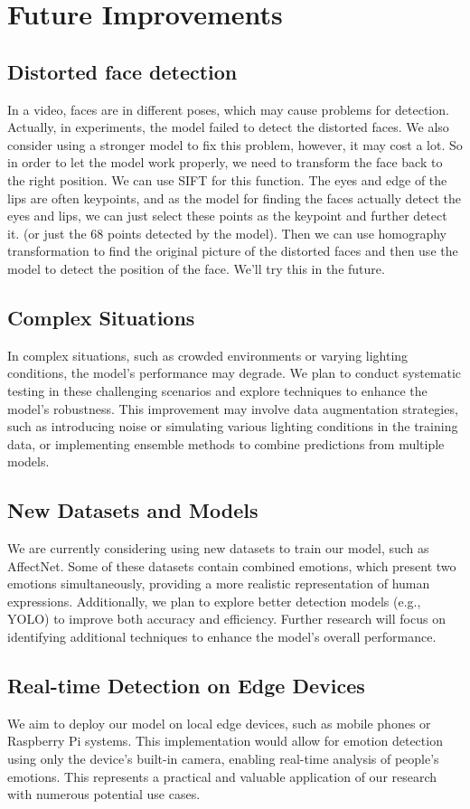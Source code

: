 \section{Future Improvements}
\subsection{Distorted face detection}
In a video, faces are in different poses, which may cause problems for detection. Actually, in experiments, the model failed to detect the distorted faces. We also consider using a stronger model to fix this problem, however, it may cost a lot. 
So in order to let the model work properly, we need to transform the face back to the right position. We can use SIFT for this function. The eyes and edge of the lips are often keypoints, and as the model for finding the faces actually detect the eyes and lips, we can just select these points as the keypoint and further detect it. (or just the 68 points detected by the model).
Then we can use homography transformation to find the original picture of the distorted faces and then use the model to detect the position of the face. We'll try this in the future.

\subsection{Complex Situations}
In complex situations, such as crowded environments or varying lighting conditions, the model's performance may degrade. We plan to conduct systematic testing in these challenging scenarios and explore techniques to enhance the model's robustness. This improvement may involve data augmentation strategies, such as introducing noise or simulating various lighting conditions in the training data, or implementing ensemble methods to combine predictions from multiple models.

\subsection{New Datasets and Models}
We are currently considering using new datasets to train our model, such as AffectNet. Some of these datasets contain combined emotions, which present two emotions simultaneously, providing a more realistic representation of human expressions. Additionally, we plan to explore better detection models (e.g., YOLO) to improve both accuracy and efficiency. Further research will focus on identifying additional techniques to enhance the model's overall performance.

\subsection{Real-time Detection on Edge Devices}
We aim to deploy our model on local edge devices, such as mobile phones or Raspberry Pi systems. This implementation would allow for emotion detection using only the device's built-in camera, enabling real-time analysis of people's emotions. This represents a practical and valuable application of our research with numerous potential use cases.
